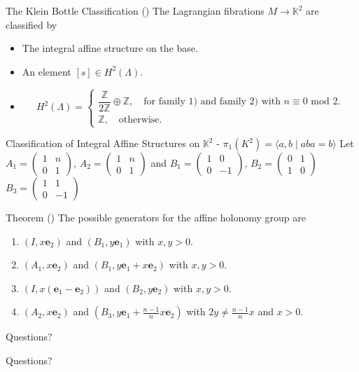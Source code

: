 \begin{frame}[c]{The Klein Bottle Classification (\cite{Sepe2010})}
	The Lagrangian fibrations $M \to \mathbb{K}^2$ are classified by
	\begin{itemize}
		\item The integral affine structure on the base.
		\item An element $[s] \in H^2(\Lambda)$.
		\item $$H^2(\Lambda) = \begin{cases}
				      \dfrac{\mathbb{Z}}{2\mathbb{Z}} \oplus \mathbb{Z}, \quad \text{for family 1) and family 2) with }n\equiv 0 \text{ mod }2. \\
				      \mathbb{Z}, \quad \text{otherwise.}
			      \end{cases}$$
	\end{itemize}
\end{frame}

\begin{frame}[c]{Classification of Integral Affine Structures on $\mathbb{K}^2$ - $\pi_1(K^2) = \langle a,b \mid aba = b \rangle$}
	Let $A_1 = \begin{pmatrix}
			1 & n \\ 0 & 1
		\end{pmatrix}$, $A_2 = \begin{pmatrix}
			1 & n \\ 0 & 1
		\end{pmatrix}$ and $B_1 = \begin{pmatrix}
			1 & 0 \\ 0 & -1
		\end{pmatrix}$, $B_2 = \begin{pmatrix}
			0 & 1 \\ 1 & 0
		\end{pmatrix}$
	$B_3 = \begin{pmatrix}
			1 & 1 \\ 0 & -1
		\end{pmatrix}$
	\begin{kulblock}{Theorem (\cite{Sepe2010})}
		The possible generators for the affine holonomy group are
		\begin{enumerate}
			\item $(I, x\textbf{e}_2)$ and $(B_1, y\textbf{e}_1)$ with $x,y > 0$.
			\item $(A_1, x\textbf{e}_2)$ and $(B_1, y\textbf{e}_1 + x\textbf{e}_2)$ with $x,y > 0$.
			\item $(I, x(\textbf{e}_1 - \textbf{e}_2))$ and $(B_2, y\textbf{e}_2)$ with $x,y > 0$.
			\item $(A_2, x\textbf{e}_2)$ and $(B_3, y\textbf{e}_1 + \frac{n-1}{n}x\textbf{e}_2)$ with $2y \neq\frac{n-1}{n}x$ and $x>0$.
		\end{enumerate}
	\end{kulblock}
\end{frame}

\begin{frame}[c]{Questions?}
	\begin{center}
		\Large Questions?
	\end{center}

\end{frame}
